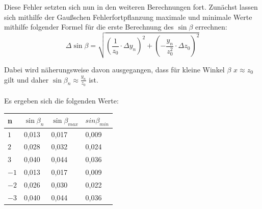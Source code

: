 \documentclass[12pt,a4paper,titlepage,headinclude,bibtotoc]{scrartcl}
\begin{document}
Diese Fehler setzten sich nun in den weiteren Berechnungen fort. Zunächst lassen sich mithilfe der Gaußschen Fehlerfortpflanzung maximale und minimale Werte mithilfe folgender Formel für die erste Berechnung des $\sin \beta$ errechnen:\\

\begin{equation}
\Delta \sin \beta = \sqrt{ \left( \dfrac{1}{z_0} \cdot \Delta y_n \right)^2 + \left(- \dfrac{y_n}{z_0^2} \cdot \Delta z_0\right)^2 } 
\end{equation}

Dabei wird näherungsweise davon ausgegangen, dass für kleine Winkel $\beta$  $x \approx z_0$ gilt und daher $\sin \beta_n \approx \frac{y_n}{z_0}$ ist.\\\\

\newpage
Es ergeben sich die folgenden Werte: \\


\begin{table} [h]
\centering
\begin{tabular}{|p{2 cm}||p{3 cm}|p{3 cm}|p{3 cm}|}
		\hline
         n & $\sin\beta_n$  & $\sin\beta_{max} $ & $sin\beta_{min}$ \\
         \hline 
         $1 $& 0,013& 0,017 & 0,009 \\
         \hline
         $2 $& 0,028&  0,032 &0,024 \\
         \hline
         $3 $& 0,040& 0,044& 0,036\\
         \hline
         $-1$& 0,013&  0,017& 0,009 \\
         \hline
         $-2$& 0,026& 0,030 & 0,022 \\
         \hline             
         $-3$& 0,040& 0,044  & 0,036 \\
         \hline
\end{tabular}
\end{table}
\end{document}
